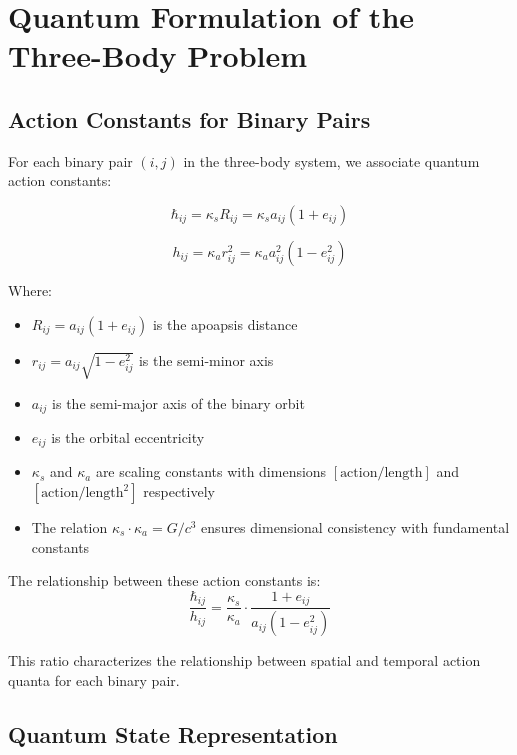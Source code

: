 \documentclass{article}
\begin{document}
\section{Quantum Formulation of the Three-Body Problem}

\subsection{Action Constants for Binary Pairs}

For each binary pair $(i,j)$ in the three-body system, we associate quantum action constants:

\begin{equation}
\hbar_{ij} = \kappa_s R_{ij} = \kappa_s a_{ij}(1+e_{ij})
\end{equation}

\begin{equation}
h_{ij} = \kappa_a r_{ij}^2 = \kappa_a a_{ij}^2(1-e_{ij}^2)
\end{equation}

Where:
\begin{itemize}
\item $R_{ij} = a_{ij}(1+e_{ij})$ is the apoapsis distance
\item $r_{ij} = a_{ij}\sqrt{1-e_{ij}^2}$ is the semi-minor axis
\item $a_{ij}$ is the semi-major axis of the binary orbit
\item $e_{ij}$ is the orbital eccentricity
\item $\kappa_s$ and $\kappa_a$ are scaling constants with dimensions $[\text{action}/\text{length}]$ and $[\text{action}/\text{length}^2]$ respectively
\item The relation $\kappa_s \cdot \kappa_a = G/c^3$ ensures dimensional consistency with fundamental constants
\end{itemize}

The relationship between these action constants is:
\begin{equation}
\frac{\hbar_{ij}}{h_{ij}} = \frac{\kappa_s}{\kappa_a} \cdot \frac{1+e_{ij}}{a_{ij}(1-e_{ij}^2)}
\end{equation}

This ratio characterizes the relationship between spatial and temporal action quanta for each binary pair.

\subsection{Quantum State Representation}
\end{document}
